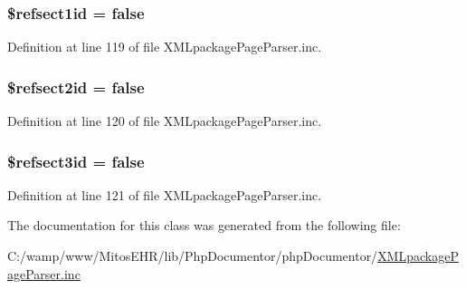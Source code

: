 \hypertarget{class_x_m_l_package_page_parser_ae4d6c02670a248fa43626873110fb716}{
\subsubsection[{\$refsect1id}]{\setlength{\rightskip}{0pt plus 5cm}\$refsect1id = false}}\label{class_x_m_l_package_page_parser_ae4d6c02670a248fa43626873110fb716}


\-Definition at line 119 of file \-X\-M\-Lpackage\-Page\-Parser.\-inc.

\hypertarget{class_x_m_l_package_page_parser_a307830a525580e27cc0906de94743e13}{
\subsubsection[{\$refsect2id}]{\setlength{\rightskip}{0pt plus 5cm}\$refsect2id = false}}\label{class_x_m_l_package_page_parser_a307830a525580e27cc0906de94743e13}


\-Definition at line 120 of file \-X\-M\-Lpackage\-Page\-Parser.\-inc.

\hypertarget{class_x_m_l_package_page_parser_ad3db9e63f8a3ade6c75cab99d441665e}{
\subsubsection[{\$refsect3id}]{\setlength{\rightskip}{0pt plus 5cm}\$refsect3id = false}}\label{class_x_m_l_package_page_parser_ad3db9e63f8a3ade6c75cab99d441665e}


\-Definition at line 121 of file \-X\-M\-Lpackage\-Page\-Parser.\-inc.



\-The documentation for this class was generated from the following file\-:\begin{DoxyCompactItemize}
\item 
\-C\-:/wamp/www/\-Mitos\-E\-H\-R/lib/\-Php\-Documentor/php\-Documentor/\hyperlink{_x_m_lpackage_page_parser_8inc}{\-X\-M\-Lpackage\-Page\-Parser.\-inc}\end{DoxyCompactItemize}
